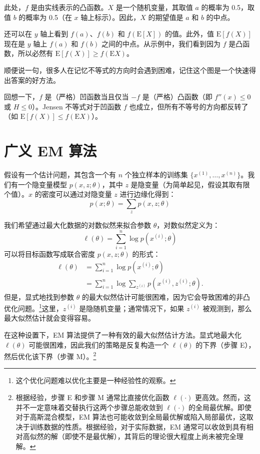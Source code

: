 此处，$f$ 是由实线表示的凸函数。$X$ 是一个随机变量，其取值 $a$ 的概率为 0.5，取值 $b$ 的概率为 0.5（在 $x$ 轴上标示）。因此，$X$ 的期望值是 $a$ 和 $b$ 的中点。

还可以在 $y$ 轴上看到 $f(a)$、$f(b)$ 和 $f(\mathrm{E}[X])$ 的值。此外，值 $\mathrm{E}[f(X)]$ 现在是 $y$ 轴上 $f(a)$ 和 $f(b)$ 之间的中点。从示例中，我们看到因为 $f$ 是凸函数，所以必然有 $\mathrm{E}[f(X)] \geq f(\mathrm{E}X)$。

顺便说一句，很多人在记忆不等式的方向时会遇到困难，记住这个图是一个快速得出答案的好方法。

\begin{remark*}
    回想一下，$f$ 是（严格）凹函数当且仅当 $-f$ 是（严格）凸函数（即 $f''(x) \leq 0$ 或 $H \leq 0$）。Jensen 不等式对于凹函数 $f$ 也成立，但所有不等号的方向都反转了（如 $\mathrm{E}[f(X)] \leq f(\mathrm{E}X)$）。
\end{remark*}

\section{广义 EM 算法}

假设有一个估计问题，其包含一个有 $n$ 个独立样本的训练集 $\{x^{(1)}, \dots, x^{(n)}\}$。我们有一个隐变量模型 $p(x, z; \theta)$，其中 $z$ 是隐变量（为简单起见，假设其取有限个值）。$x$ 的密度可以通过对隐变量 $z$ 进行边缘化得到：
\begin{equation}
    p(x; \theta) = \sum_z p(x, z; \theta)
    \label{eq:11.1}
\end{equation}

我们希望通过最大化数据的对数似然来拟合参数 $\theta$，对数似然定义为：
\begin{equation}
    \ell(\theta) = \sum_{i=1}^n \log p(x^{(i)}; \theta)
    \label{eq:11.2}
\end{equation}
可以将目标函数写成联合密度 $p(x, z; \theta)$ 的形式：
\begin{align}
    \ell(\theta) 
    &= \sum_{i=1}^n \log p(x^{(i)}; \theta) \label{eq:11.3} \\
    &= \sum_{i=1}^n \log \sum_{z^{(i)}} p(x^{(i)}, z^{(i)}; \theta). \label{eq:11.4}
\end{align}
但是，显式地找到参数 $\theta$ 的最大似然估计可能很困难，因为它会导致困难的非凸优化问题。\footnote{这个优化问题难以优化主要是一种经验性的观察。}这里，$z^{(i)}$ 是隐随机变量；通常情况下，如果 $z^{(i)}$ 被观测到，那么最大似然估计就会变得容易。

在这种设置下，EM 算法提供了一种有效的最大似然估计方法。显式地最大化 $\ell(\theta)$ 可能很困难，因此我们的策略是反复构造一个 $\ell(\theta)$ 的下界（步骤 E），然后优化该下界（步骤 M）。\footnote{根据经验，步骤 E 和步骤 M 通常比直接优化函数 $\ell(\cdot)$ 更高效。然而，这并不一定意味着交替执行这两个步骤总能收敛到 $\ell(\cdot)$ 的全局最优解。即使对于高斯混合模型，EM 算法也可能收敛到全局最优解或陷入局部最优，这取决于训练数据的性质。根据经验，对于实际数据，EM 通常可以收敛到具有相对高似然的解（即使不是最优解），其背后的理论很大程度上尚未被完全理解。}

